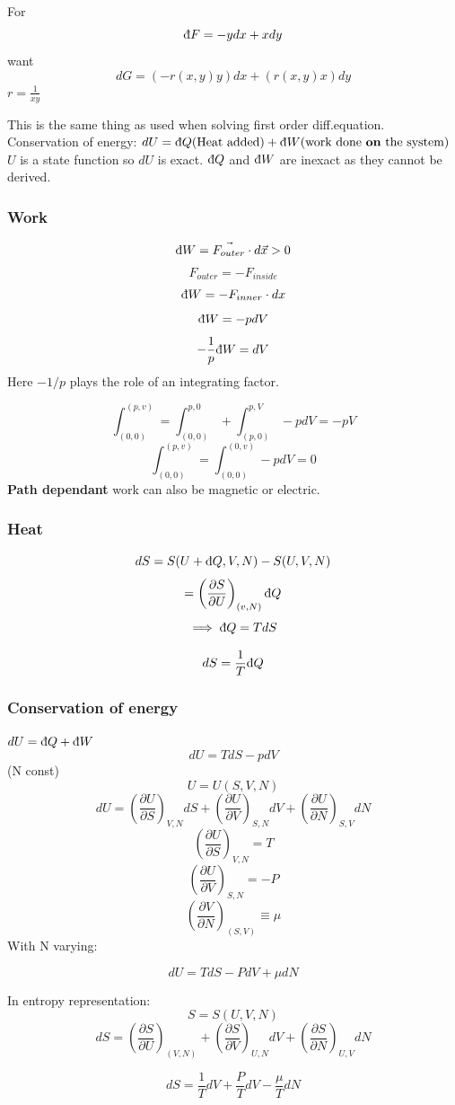 \documentclass[11pt]{book}
\theoremstyle{definition}
\begin{document}
For \[ \text{\dj} F = -ydx+xdy \]
want 
\[ dG = (-r(x,y)y)dx + (r(x,y)x) dy\] 
$ r = \frac{1}{xy} $ 

This is the same thing as used when solving first order diff.equation. \\
Conservation of energy:
$ dU = \text{\dj} Q \text{(Heat added)} + \text{\dj} W \text{(work done \textbf{on} the system)}$
$ U $  is a state function so $ dU $ is exact.
$ \text{\dj} Q $ and $ \text{\dj} W $ are inexact as they cannot be derived.   

\subsubsection{Work}%
\label{ssub:Work}

\begin{equation}
	\text{\dj} W = \vec{F_{outer}} \cdot d \vec{x} > 0
\end{equation}
\[ F_{outer} = - F_{inside} \] 
\[ \text{\dj} W = -F_{inner} \cdot dx \] 
\[ \text{\dj} W = -pdV \] 
\[ -\frac{1}{p} \text{\dj} W = dV \] 
Here $ -1/p $ plays the role of an integrating factor.

\[ \int_{(0,0)}^{(p,v)} = \int_{(0,0)}^{p,0} + \int_{(p,0)}^{p,V} -p dV = -pV\] 
\[ \int_{(0,0)}^{(p,v)} = \int_{(0,0)}^{(0,v)} -pdV = 0   \] 
\textbf{Path dependant} 
work can also be magnetic or electric.
\subsubsection{Heat}%
\[ dS = S(U+\text{\dj} Q, V, N) - S(U,V,N) \] 
\[ = \left( \frac{\partial S}{\partial U} \right)_{(v,N)} \text{\dj} Q  \] 
\[ \implies \text{\dj} Q = T dS \] 

\[ dS = \frac{1}{T} \text{\dj} Q \] 

\subsubsection{Conservation of energy}%
\label{ssub:Conservationofenergy}
$ dU = \text{\dj} Q + \text{\dj} W $ 
\[ dU = T dS - pdV \] (N const)
\[ U = U(S,V,N) \] 
\[ dU = \left ( \frac{\partial U}{\partial S}\right )_{V,N} dS + \left ( \frac{\partial U}{\partial V}\right )_{S,N} dV + \left( \frac{\partial U}{\partial N}\right )_{S,V} dN \] 
\[ \left(\frac{\partial U}{\partial S}\right)_{V,N} = T \] 
\[ \left(\frac{\partial U}{\partial V}\right)_{S,N} = -P \] 
\[ \left(\frac{\partial V}{\partial N}\right)_{(S,V)} \equiv \mu \] 
With N varying:
\begin{shaded*}
\[ dU = TdS - PdV + \mu dN \] 
\end{shaded*}
In entropy representation:
	\[ S = S(U,V,N) \] 
	\[ dS = \left(\frac{\partial S}{\partial U}\right)_{(V,N)} + \left(\frac{\partial S}{\partial V}\right)_{U,N} dV +
	\left(\frac{\partial S}{\partial N}\right)_{U,V} dN\] 	
\begin{shaded*}
	\[ dS = \frac{1}{T} dV + \frac{P}{T}dV - \frac{\mu}{T}dN \] 
\end{shaded*}
\end{document}
